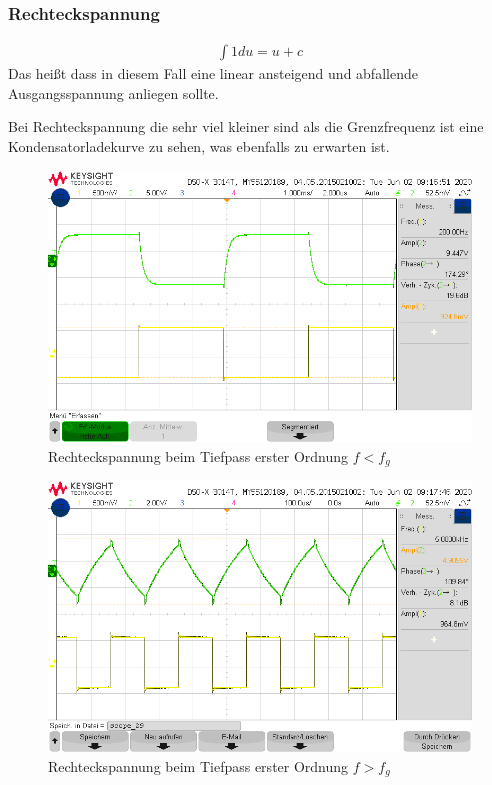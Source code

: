 \subsubsection{Rechteckspannung}
\begin{align}
    \int{1 du} = u + c
\end{align}
Das heißt dass in diesem Fall eine linear ansteigend und abfallende Ausgangsspannung anliegen sollte.

Bei Rechteckspannung die sehr viel kleiner sind als die Grenzfrequenz ist eine Kondensatorladekurve zu sehen, was ebenfalls zu erwarten ist. 

\begin{figure}[H]
    \centering
    \includegraphics[width=\costumPicWidth]{Lab_2/Messungen/TP_first_order/scope_26.png}
    \caption{Rechteckspannung beim Tiefpass erster Ordnung $f < f_g$}
    \label{fig:Rechteck_Tiefpass_erster_Ordnung_small_f}
\end{figure}
\begin{figure}[H]
    \centering
    \includegraphics[width=\costumPicWidth]{Lab_2/Messungen/TP_first_order/scope_29.png}
    \caption{Rechteckspannung beim Tiefpass erster Ordnung $f > f_g$}
    \label{fig:Rechteck_Tiefpass_erster_Ordnung_big_f}
\end{figure}

